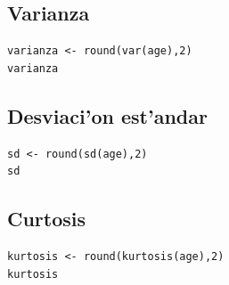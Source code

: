 \subsection{Varianza}
\begin{verbatim}
varianza <- round(var(age),2)
varianza
\end{verbatim}

\subsection{Desviaci'on est'andar}

\begin{verbatim}
sd <- round(sd(age),2)
sd
\end{verbatim}

\subsection{Curtosis}
\begin{verbatim}
kurtosis <- round(kurtosis(age),2)
kurtosis
\end{verbatim}



